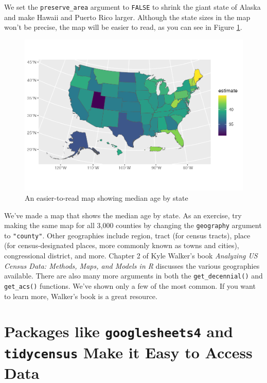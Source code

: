 \documentclass[
]{book}
\begin{document}
We set the \texttt{preserve\_area} argument to \texttt{FALSE} to shrink the giant state of Alaska and make Hawaii and Puerto Rico larger. Although the state sizes in the map won't be precise, the map will be easier to read, as you can see in Figure \ref{fig:median-age-map-good}.

\begin{figure}
\includegraphics[width=1\linewidth]{accessing-data_files/figure-latex/median-age-map-good-1} \caption{An easier-to-read map showing median age by state}\label{fig:median-age-map-good}
\end{figure}

We've made a map that shows the median age by state. As an exercise, try making the same map for all 3,000 counties by changing the \texttt{geography} argument to \texttt{"county"}. Other geographies include region, tract (for census tracts), place (for census-designated places, more commonly known as towns and cities), congressional district, and more. Chapter 2 of Kyle Walker's book \emph{Analyzing US Census Data: Methods, Maps, and Models in R} discusses the various geographies available. There are also many more arguments in both the \texttt{get\_decennial()} and \texttt{get\_acs()} functions. We've shown only a few of the most common. If you want to learn more, Walker's book is a great resource.

\hypertarget{packages-like-googlesheets4-and-tidycensus-make-it-easy-to-access-data}{%
\section*{\texorpdfstring{Packages like \texttt{googlesheets4} and \texttt{tidycensus} Make it Easy to Access Data}{Packages like googlesheets4 and tidycensus Make it Easy to Access Data}}\label{packages-like-googlesheets4-and-tidycensus-make-it-easy-to-access-data}}
\end{document}
